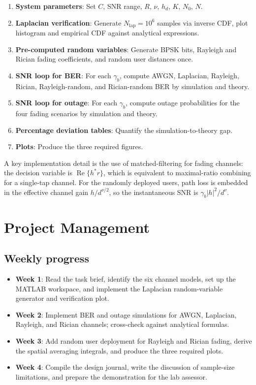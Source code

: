 \documentclass[12pt,a4paper]{article}
\begin{document}
\begin{enumerate}[label=\arabic*.]
    \item \textbf{System parameters}: Set $C$, SNR range, $R$, $\nu$, $h_d$, $K$, $N_0$, $N$.
    \item \textbf{Laplacian verification}: Generate $N_{\text{lap}}=10^6$ samples via inverse CDF, plot histogram and empirical CDF against analytical expressions.
    \item \textbf{Pre-computed random variables}: Generate BPSK bits, Rayleigh and Rician fading coefficients, and random user distances once.
    \item \textbf{SNR loop for BER}: For each $\gamma_b$, compute AWGN, Laplacian, Rayleigh, Rician, Rayleigh-random, and Rician-random BER by simulation and theory.
    \item \textbf{SNR loop for outage}: For each $\gamma_b$, compute outage probabilities for the four fading scenarios by simulation and theory.
    \item \textbf{Percentage deviation tables}: Quantify the simulation-to-theory gap.
    \item \textbf{Plots}: Produce the three required figures.
\end{enumerate}

A key implementation detail is the use of matched-filtering for fading channels: the decision variable is $\operatorname{Re}\{h^*r\}$, which is equivalent to maximal-ratio combining for a single-tap channel. For the randomly deployed users, path loss is embedded in the effective channel gain $h/d^{\nu/2}$, so the instantaneous SNR is $\gamma_b|h|^2/d^{\nu}$.

\section{Project Management}\label{sec:management}

\subsection{Weekly progress}
\begin{itemize}
    \item \textbf{Week 1}: Read the task brief, identify the six channel models, set up the MATLAB workspace, and implement the Laplacian random-variable generator and verification plot.
    \item \textbf{Week 2}: Implement BER and outage simulations for AWGN, Laplacian, Rayleigh, and Rician channels; cross-check against analytical formulas.
    \item \textbf{Week 3}: Add random user deployment for Rayleigh and Rician fading, derive the spatial averaging integrals, and produce the three required plots.
    \item \textbf{Week 4}: Compile the design journal, write the discussion of sample-size limitations, and prepare the demonstration for the lab assessor.
\end{itemize}
\end{document}
